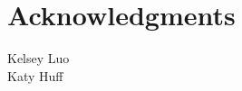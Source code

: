 \documentclass[edeposit,fullpage,11pt]{uiucthesis2018}
\title{\pygen}
\author{Samuel G. Dotson}
\begin{document}
\maketitle

\frontmatter
\begin{abstract}

Abstract.

\end{abstract}

\chapter*{Acknowledgments}

Kelsey Luo\\
Katy Huff



\tableofcontents
\listoftables
\listoffigures


\pagebreak
\mainmatter

% 

% 
\end{document}
